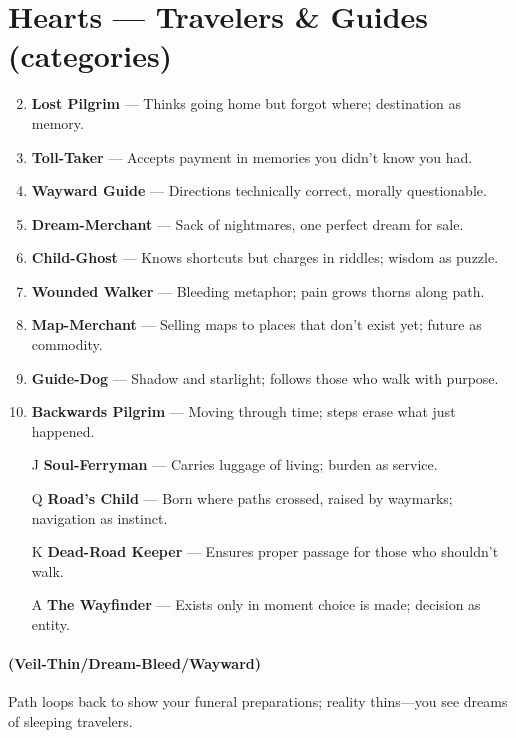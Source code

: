 \section*{Hearts --- Travelers \& Guides (categories)}
\label{sec:ways-between-people}
\begin{enumerate}
\setcounter{enumi}{1}
\item \textbf{Lost Pilgrim} --- Thinks going home but forgot where; destination as memory.
\item \textbf{Toll-Taker} --- Accepts payment in memories you didn't know you had.
\item \textbf{Wayward Guide} --- Directions technically correct, morally questionable.
\item \textbf{Dream-Merchant} --- Sack of nightmares, one perfect dream for sale.
\item \textbf{Child-Ghost} --- Knows shortcuts but charges in riddles; wisdom as puzzle.
\item \textbf{Wounded Walker} --- Bleeding metaphor; pain grows thorns along path.
\item \textbf{Map-Merchant} --- Selling maps to places that don't exist yet; future as commodity.
\item \textbf{Guide-Dog} --- Shadow and starlight; follows those who walk with purpose.
\item \textbf{Backwards Pilgrim} --- Moving through time; steps erase what just happened.
\item[J] \textbf{Soul-Ferryman} --- Carries luggage of living; burden as service.
\item[Q] \textbf{Road's Child} --- Born where paths crossed, raised by waymarks; navigation as instinct.
\item[K] \textbf{Dead-Road Keeper} --- Ensures proper passage for those who shouldn't walk.
\item[A] \textbf{The Wayfinder} --- Exists only in moment choice is made; decision as entity.
\end{enumerate}

\paragraph*{(Veil-Thin/Dream-Bleed/Wayward)} Path loops back to show your funeral preparations; reality thins---you see dreams of sleeping travelers.

